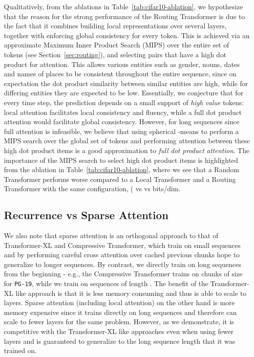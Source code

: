 \documentclass[a4paper]{article}
\begin{document}
Qualitatively, from the ablations in Table~\ref{tab:cifar10-ablation},
we hypothesize that the reason for the strong performance of the Routing Transformer
is due to the fact that it combines building local representations over several
layers, together with enforcing global consistency for every token. This is achieved
via an approximate Maximum Inner Product Search (MIPS) over the entire set of tokens
(see Section~\ref{sec:routing}),
and selecting pairs that have a high dot product for attention.
This allows various entities such as gender, nouns, dates and 
names of places to be consistent throughout the entire sequence, 
since on expectation the dot product similarity
between similar entities are high, while for differing entities they are expected to be low. 
Essentially, we conjecture that for every time step, the prediction depends on a small 
support of \emph{high value} tokens:
local attention facilitates local consistency and fluency, while a full dot product attention
would facilitate global consistency. However, for long sequences since full attention is 
infeasible, we believe that using spherical -means to perform a MIPS search over the 
global set of tokens and performing attention between these high dot product items
is a good approximation to \emph{full dot product attention}. The importance of the MIPS
search to select high dot product items is highlighted from the ablation in 
Table~\ref{tab:cifar10-ablation}, where we see that a Random Transformer 
performs worse compared to a Local Transformer and a Routing Transformer
with the same configuration, ( vs  vs  bits/dim.

\subsection{Recurrence vs Sparse Attention}
We also note that sparse attention is an orthogonal approach to that of Transformer-XL and 
Compressive Transformer,
which train on small sequences and by performing careful cross attention over cached previous chunks hope to generalize to longer sequences. By contrast, we directly train on long sequences from the beginning - 
e.g., the Compressive Transformer trains on chunks of size  for \texttt{PG-19}, while 
we train on sequences of length . 
The benefit of the Transformer-XL like approach is that it is less memory consuming
and thus is able to scale to  layers. 
Sparse attention (including local attention) on the other hand is more memory 
expensive since it trains directly on long sequences and therefore
can scale to fewer layers for the same problem. However, as we demonstrate, it is competitive
with the Transformer-XL like approaches even when using fewer layers and is guaranteed to generalize to the long 
sequence length that it was trained on.
\end{document}
